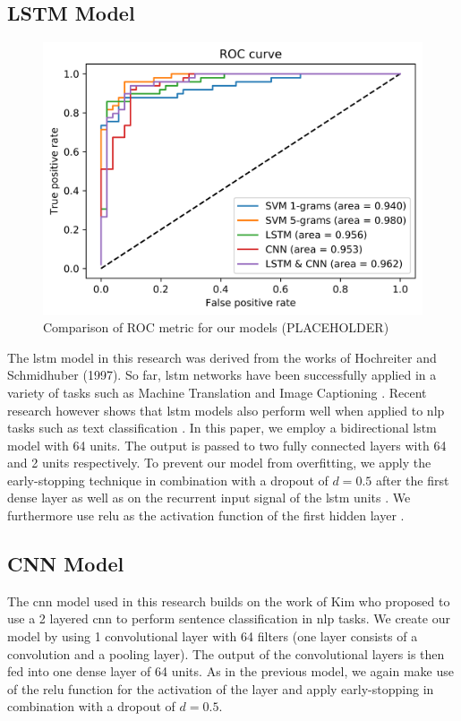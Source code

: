 \documentclass[11pt]{article}
\begin{document}
\subsection{LSTM Model}
\begin{figure}
\centering
  \includegraphics[width=0.8\linewidth]{roc_curve}
 \caption{Comparison of ROC metric for our models (PLACEHOLDER)}
\label{fig:f1_scores}
\end{figure}
The \ac{lstm} model in this research was derived from the works of Hochreiter and Schmidhuber (1997). So far, \ac{lstm} networks have been successfully applied in a variety of tasks such as Machine Translation \cite{RN76} and Image Captioning \cite{RN77}. Recent research however shows that \ac{lstm} models also perform well when applied to \ac{nlp} tasks such as text classification \cite{RN57,RN78}.
\newline 
In this paper, we employ a bidirectional \ac{lstm} model with 64 units. The output is passed to two fully connected layers with 64 and 2 units respectively. To prevent our model from overfitting, we  apply the early-stopping technique \cite{RN79} in combination with a dropout of $d=0.5$ after the first dense layer as well as on the recurrent input signal of the \ac{lstm} units \cite{RN66}. We furthermore use \ac{relu} as the activation function of the first hidden layer \cite{RN71,RN72}. 
\subsection{CNN Model}
The \ac{cnn} model used in this research builds on the work of Kim  who proposed to use a 2 layered \ac{cnn} to perform sentence classification in \ac{nlp} tasks. We create our model by using 1 convolutional layer with 64 filters (one layer consists of a convolution and a pooling layer). The output of the convolutional layers is then fed into one dense layer of 64 units.  As in the previous model, we again make use of the \ac{relu} function for the activation of the layer and apply early-stopping in combination with a dropout of $d=0.5$.
\end{document}

